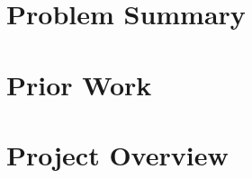 


\section{Problem Summary}
    
    
\section{Prior Work}
    

\section{Project Overview}
    



\newpage
